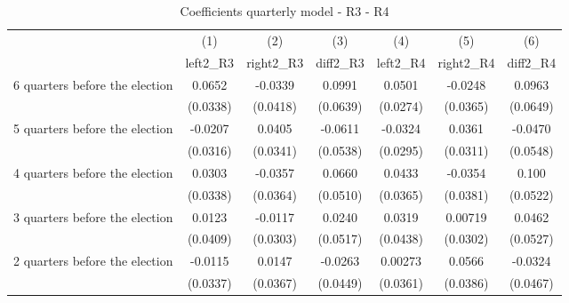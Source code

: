 \begin{table}[!ht]\centering \footnotesize
\def\sym#1{\ifmmode^{#1}\else\(^{#1}\)\fi}
\caption{Coefficients quarterly model - R3 - R4}
\begin{tabular}{l*{6}{c}}
\hline\hline
                    &\multicolumn{1}{c}{(1)}&\multicolumn{1}{c}{(2)}&\multicolumn{1}{c}{(3)}&\multicolumn{1}{c}{(4)}&\multicolumn{1}{c}{(5)}&\multicolumn{1}{c}{(6)}\\
                    &\multicolumn{1}{c}{left2\_R3}&\multicolumn{1}{c}{right2\_R3}&\multicolumn{1}{c}{diff2\_R3}&\multicolumn{1}{c}{left2\_R4}&\multicolumn{1}{c}{right2\_R4}&\multicolumn{1}{c}{diff2\_R4}\\
\hline
 6 quarters before the election&      0.0652         &     -0.0339         &      0.0991         &      0.0501         &     -0.0248         &      0.0963         \\
                    &    (0.0338)         &    (0.0418)         &    (0.0639)         &    (0.0274)         &    (0.0365)         &    (0.0649)         \\
[1em]
 5 quarters before the election&     -0.0207         &      0.0405         &     -0.0611         &     -0.0324         &      0.0361         &     -0.0470         \\
                    &    (0.0316)         &    (0.0341)         &    (0.0538)         &    (0.0295)         &    (0.0311)         &    (0.0548)         \\
[1em]
 4 quarters before the election&      0.0303         &     -0.0357         &      0.0660         &      0.0433         &     -0.0354         &       0.100         \\
                    &    (0.0338)         &    (0.0364)         &    (0.0510)         &    (0.0365)         &    (0.0381)         &    (0.0522)         \\
[1em]
 3 quarters before the election&      0.0123         &     -0.0117         &      0.0240         &      0.0319         &     0.00719         &      0.0462         \\
                    &    (0.0409)         &    (0.0303)         &    (0.0517)         &    (0.0438)         &    (0.0302)         &    (0.0527)         \\
[1em]
 2 quarters before the election&     -0.0115         &      0.0147         &     -0.0263         &     0.00273         &      0.0566         &     -0.0324         \\
                    &    (0.0337)         &    (0.0367)         &    (0.0449)         &    (0.0361)         &    (0.0386)         &    (0.0467)         \\

\end{tabular}
\end{table}
